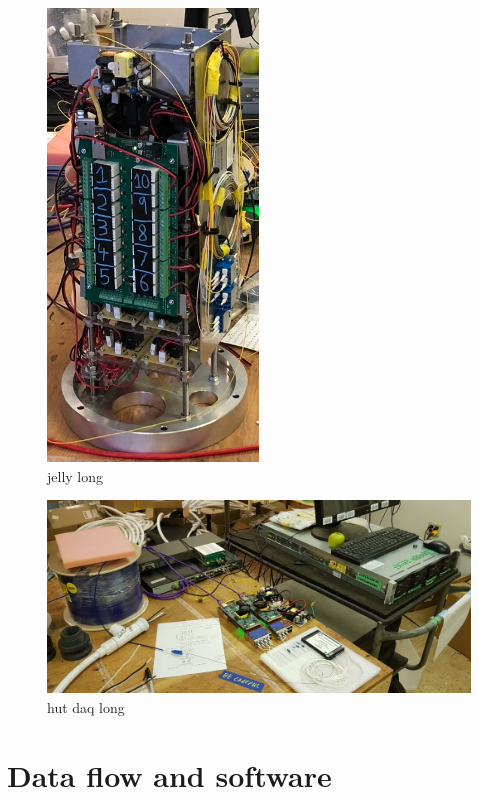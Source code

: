 \begin{figure} %
    \includegraphics[width=0.5\textwidth]{diagrams/5-daq/jelly.jpeg}
    \caption[jelly short]
    {jelly long}
    \label{fig:jelly}
\end{figure}

\begin{figure} %
    \includegraphics[width=\textwidth]{diagrams/5-daq/hut_daq.jpg}
    \caption[hut daq short]
    {hut daq long}
    \label{fig:hut_daq}
\end{figure}

\section{Data flow and software} %
\label{sec:daq_soft} %

